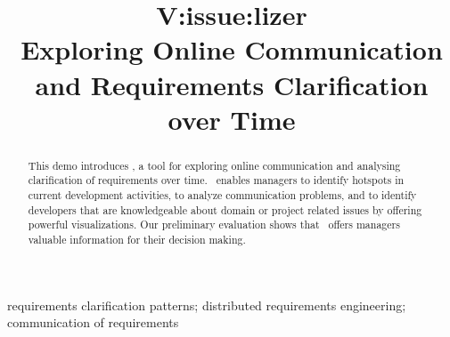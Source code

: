
\title{V:issue:lizer\\Exploring Online Communication and  Requirements Clarification over Time}


\author{
}

\maketitle


\begin{abstract}
This demo introduces \viss, a tool for exploring online communication and analysing clarification of requirements over time.
\viss\ enables managers to identify hotspots in current development activities, to analyze communication problems, and to identify developers that are knowledgeable about domain or project related issues by offering powerful visualizations.
Our preliminary evaluation shows that \viss\ offers managers valuable information for their decision making.
\end{abstract}

\begin{IEEEkeywords}
requirements clarification patterns; distributed requirements engineering; communication of requirements
\end{IEEEkeywords}
